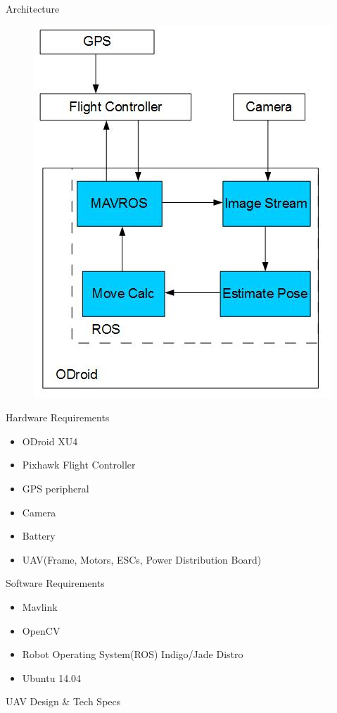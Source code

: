 \documentclass[11pt]{beamer}
\begin{document}
\begin{frame}{Architecture}
\begin{figure}
\includegraphics[width=.5\textwidth]{images/broad_approach1}
\end{figure}

\end{frame}

\begin{frame}{Hardware Requirements}
\begin{itemize}
\item ODroid XU4
\item Pixhawk Flight Controller
\item GPS peripheral
\item Camera
\item Battery
\item UAV(Frame, Motors, ESCs, Power Distribution Board)
\end{itemize}

\end{frame}

\begin{frame}{Software Requirements}
\begin{itemize}
\item Mavlink
\item OpenCV
\item Robot Operating System(ROS) Indigo/Jade Distro
\item Ubuntu 14.04
\end{itemize}

\end{frame}



\begin{frame}{UAV Design \& Tech Specs}

\end{frame}
\end{document}
